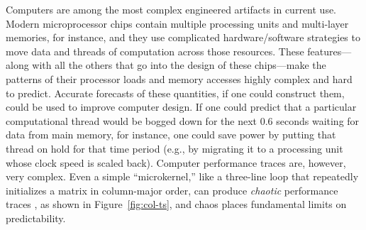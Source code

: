 \documentclass{article}
\begin{document}
Computers are among the most complex engineered artifacts in current
use.  Modern microprocessor chips contain multiple processing units
and multi-layer memories, for instance, and they use complicated
hardware/software strategies to move data and threads of computation
across those resources.  These features---along with all the others
that go into the design of these chips---make the patterns of their
processor loads and memory accesses highly complex and hard to
predict.  Accurate forecasts of these quantities, if one could
construct them, could be used to improve computer design.  If one
could predict that a particular computational thread would be bogged
down for the next 0.6 seconds waiting for data from main memory, for
instance, one could save power by putting that thread on hold for that
time period (e.g., by migrating it to a processing unit whose clock
speed is scaled back).  Computer performance traces are, however, very
complex.  Even a simple ``microkernel,'' like a three-line loop that
repeatedly initializes a matrix in column-major order, can produce
{\sl chaotic} performance traces \cite{mytkowicz09}, as shown in
Figure~\ref{fig:col-ts}, and chaos places fundamental limits on
predictability.
%
\end{document}
